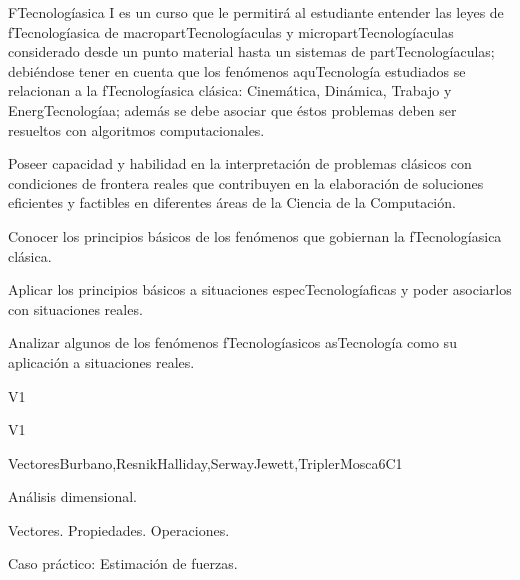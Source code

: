 \begin{syllabus}


\begin{justification}
FTecnologíasica I es un curso que le permitirá al estudiante entender
las leyes de fTecnologíasica de macropartTecnologíaculas y micropartTecnologíaculas considerado desde un
punto material hasta un sistemas de partTecnologíaculas; debiéndose tener en cuenta que los
fenómenos aquTecnología estudiados se relacionan a la fTecnologíasica clásica: Cinemática, Dinámica, Trabajo y EnergTecnologíaa; 
además se debe asociar que éstos problemas deben ser resueltos con algoritmos computacionales.

Poseer capacidad y habilidad en la interpretación de problemas clásicos
con condiciones de frontera reales que contribuyen en la elaboración de soluciones eficientes
y factibles en diferentes áreas de la Ciencia de la Computación.
\end{justification}

\begin{goals}
\item Conocer los principios básicos de los fenómenos que gobiernan la fTecnologíasica clásica.
\item Aplicar los principios básicos a situaciones especTecnologíaficas y poder asociarlos con situaciones reales.
\item Analizar algunos de los fenómenos fTecnologíasicos asTecnología como su aplicación a situaciones reales.
\end{goals}

\begin{outcomes}{V1}
  \item {}
  \item {}
  \item {}
\end{outcomes}

\begin{competences}{V1}
  \item {} 
  \item {}
  \item {}
\end{competences}

\begin{unit}{}{Vectores}{Burbano,ResnikHalliday,SerwayJewett,TriplerMosca}{6}{C1}
\begin{topics}
      \item Análisis dimensional.
      \item Vectores. Propiedades. Operaciones.
      \item Caso práctico: Estimación de fuerzas.
   \end{topics}


\end{unit}
\end{syllabus}
